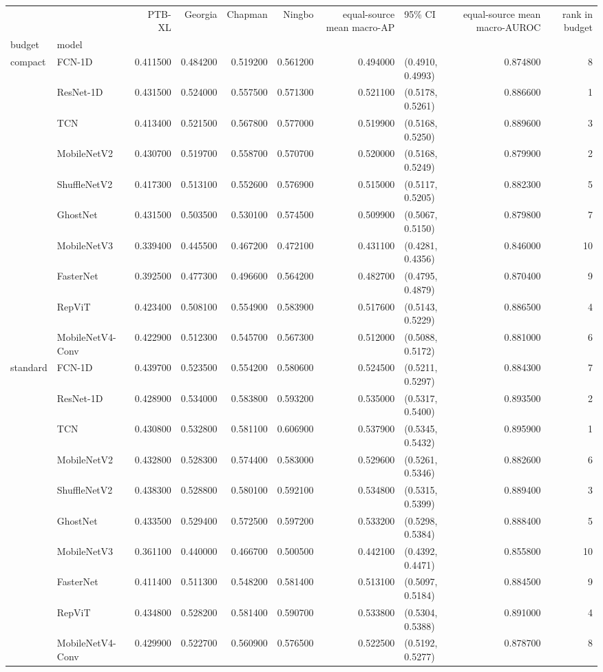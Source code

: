 \begin{tabular}{llrrrrrlrr}
\toprule
 &  & PTB-XL & Georgia & Chapman & Ningbo & equal-source mean macro-AP & 95\% CI & equal-source mean macro-AUROC & rank in budget \\
budget & model &  &  &  &  &  &  &  &  \\
\midrule
\multirow[t]{10}{*}{compact} & FCN-1D & 0.411500 & 0.484200 & 0.519200 & 0.561200 & 0.494000 & (0.4910, 0.4993) & 0.874800 & 8 \\
 & ResNet-1D & 0.431500 & 0.524000 & 0.557500 & 0.571300 & 0.521100 & (0.5178, 0.5261) & 0.886600 & 1 \\
 & TCN & 0.413400 & 0.521500 & 0.567800 & 0.577000 & 0.519900 & (0.5168, 0.5250) & 0.889600 & 3 \\
 & MobileNetV2 & 0.430700 & 0.519700 & 0.558700 & 0.570700 & 0.520000 & (0.5168, 0.5249) & 0.879900 & 2 \\
 & ShuffleNetV2 & 0.417300 & 0.513100 & 0.552600 & 0.576900 & 0.515000 & (0.5117, 0.5205) & 0.882300 & 5 \\
 & GhostNet & 0.431500 & 0.503500 & 0.530100 & 0.574500 & 0.509900 & (0.5067, 0.5150) & 0.879800 & 7 \\
 & MobileNetV3 & 0.339400 & 0.445500 & 0.467200 & 0.472100 & 0.431100 & (0.4281, 0.4356) & 0.846000 & 10 \\
 & FasterNet & 0.392500 & 0.477300 & 0.496600 & 0.564200 & 0.482700 & (0.4795, 0.4879) & 0.870400 & 9 \\
 & RepViT & 0.423400 & 0.508100 & 0.554900 & 0.583900 & 0.517600 & (0.5143, 0.5229) & 0.886500 & 4 \\
 & MobileNetV4-Conv & 0.422900 & 0.512300 & 0.545700 & 0.567300 & 0.512000 & (0.5088, 0.5172) & 0.881000 & 6 \\
\cline{1-10}
\multirow[t]{10}{*}{standard} & FCN-1D & 0.439700 & 0.523500 & 0.554200 & 0.580600 & 0.524500 & (0.5211, 0.5297) & 0.884300 & 7 \\
 & ResNet-1D & 0.428900 & 0.534000 & 0.583800 & 0.593200 & 0.535000 & (0.5317, 0.5400) & 0.893500 & 2 \\
 & TCN & 0.430800 & 0.532800 & 0.581100 & 0.606900 & 0.537900 & (0.5345, 0.5432) & 0.895900 & 1 \\
 & MobileNetV2 & 0.432800 & 0.528300 & 0.574400 & 0.583000 & 0.529600 & (0.5261, 0.5346) & 0.882600 & 6 \\
 & ShuffleNetV2 & 0.438300 & 0.528800 & 0.580100 & 0.592100 & 0.534800 & (0.5315, 0.5399) & 0.889400 & 3 \\
 & GhostNet & 0.433500 & 0.529400 & 0.572500 & 0.597200 & 0.533200 & (0.5298, 0.5384) & 0.888400 & 5 \\
 & MobileNetV3 & 0.361100 & 0.440000 & 0.466700 & 0.500500 & 0.442100 & (0.4392, 0.4471) & 0.855800 & 10 \\
 & FasterNet & 0.411400 & 0.511300 & 0.548200 & 0.581400 & 0.513100 & (0.5097, 0.5184) & 0.884500 & 9 \\
 & RepViT & 0.434800 & 0.528200 & 0.581400 & 0.590700 & 0.533800 & (0.5304, 0.5388) & 0.891000 & 4 \\
 & MobileNetV4-Conv & 0.429900 & 0.522700 & 0.560900 & 0.576500 & 0.522500 & (0.5192, 0.5277) & 0.878700 & 8 \\
\cline{1-10}
\bottomrule
\end{tabular}
